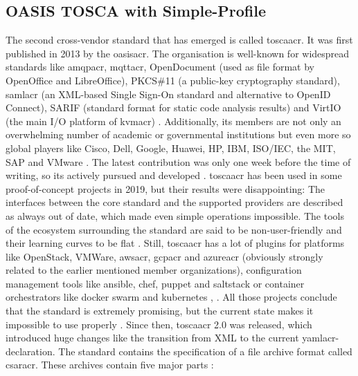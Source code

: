 \subsection{OASIS TOSCA with Simple-Profile}
The second cross-vendor standard that has emerged is called \gls{toscaacr}. It was first published in 2013 by the \gls{oasisacr}. The organisation is well-known for widespread standards like \gls{amqpacr}, \gls{mqttacr}, OpenDocument (used as file format by OpenOffice and LibreOffice), PKCS\#11 (a public-key cryptography standard), \gls{samlacr} (an XML-based Single Sign-On standard and alternative to OpenID Connect), SARIF (standard format for static code analysis results) and VirtIO (the main I/O platform of \gls{kvmacr}) \cite{oasis_standards}. Additionally, its members are not only an overwhelming number of academic or governmental institutions but even more so global players like Cisco, Dell, Google, Huawei, HP, IBM, ISO/IEC, the MIT, SAP and VMware \cite{oasis_tosca_members} \cite{oasis_tosca_obligations} \cite{oasis_members}. The latest contribution was only one week before the time of writing, so its actively pursued and developed \cite{tosca_standard_v2} \cite{tosca_releases}.
\newline
\gls{toscaacr} has been used in some proof-of-concept projects \cite{dsl_for_iac} in 2019, but their results were disappointing: The interfaces between the core standard and the supported providers are described as always out of date, which made even simple operations impossible. The tools of the ecosystem surrounding the standard are said to be non-user-friendly and their learning curves to be flat \cite{adminmagazin_aria_tosca}.
Still, \gls{toscaacr} has a lot of plugins for platforms like OpenStack, VMWare, \gls{awsacr}, \gls{gcpacr} and \gls{azureacr} (obviously strongly related to the earlier mentioned member organizations), configuration management tools like ansible, chef, puppet and saltstack or container orchestrators like docker swarm and kubernetes \cite{opentosca_presentation} \cite{adminmagazin_aria_tosca}, \cite{vmware_tosca_components}.
All those projects conclude that the standard is extremely promising, but the current state makes it impossible to use properly \cite{adminmagazin_aria_tosca}.
\newline
Since then, \gls{toscaacr} 2.0 was released, which introduced huge changes like the transition from XML to the current \gls{yamlacr}-declaration.
\newline
The standard contains the specification of a file archive format called \gls{csaracr}. These archives contain five major parts \cite{opentosca_how_to_csar}:
